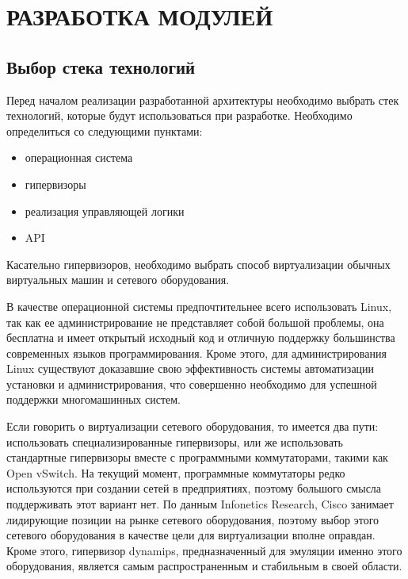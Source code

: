 \chapter{РАЗРАБОТКА МОДУЛЕЙ}

\section{Выбор стека технологий}

Перед началом реализации разработанной архитектуры необходимо выбрать
стек технологий, которые будут использоваться при разработке.
Необходимо определиться со следующими пунктами:
\begin{itemize}
    \item операционная система
    \item гипервизоры
    \item реализация управляющей логики
    \item API
\end{itemize}
Касательно гипервизоров, необходимо выбрать способ виртуализации обычных виртуальных машин
и сетевого оборудования.

В качестве операционной системы предпочтительнее всего использовать Linux, так как ее 
администрирование не представляет собой большой проблемы, она бесплатна и имеет
открытый исходный код и отличную поддержку большинства современных языков 
программирования. Кроме этого, для администрирования Linux существуют доказавшие
свою эффективность системы автоматизации установки и администрирования, что совершенно
необходимо для успешной поддержки многомашинных систем.

Если говорить о виртуализации сетевого оборудования, то имеется два пути: использовать
специализированные гипервизоры, или же использовать стандартные гипервизоры вместе с
программными коммутаторами, такими как Open vSwitch. На текущий момент, программные
коммутаторы редко используются при создании сетей в предприятиях, поэтому большого
смысла поддерживать этот вариант нет. По данным Infonetics Research, Cisco занимает
лидирующие позиции на рынке сетевого оборудования,
поэтому выбор этого сетевого оборудования в качестве цели для виртуализации вполне оправдан.
Кроме этого, гипервизор dynamips, предназначенный для эмуляции именно этого оборудования,
является самым распространенным и стабильным в своей области. %

